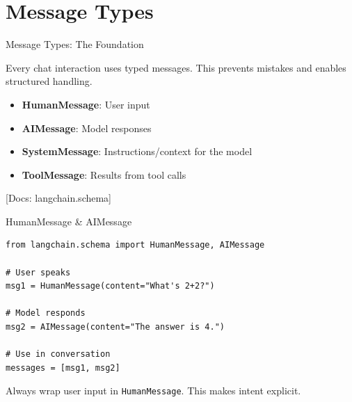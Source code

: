 \documentclass[aspectratio=169,11pt]{beamer}
\newcommand{\docref}[1]{{\scriptsize\color{docgray}[Docs: #1]}}
\begin{document}
\section{Message Types}

\begin{frame}[fragile]{Message Types: The Foundation}
  \begin{conceptbox}
    Every chat interaction uses typed messages. This prevents mistakes and enables structured handling.
  \end{conceptbox}

  \begin{itemize}
    \setlength{\itemsep}{1pt}
    \item \textbf{HumanMessage}: User input
    \item \textbf{AIMessage}: Model responses
    \item \textbf{SystemMessage}: Instructions/context for the model
    \item \textbf{ToolMessage}: Results from tool calls
  \end{itemize}

  \docref{langchain.schema}
\end{frame}

\begin{frame}[fragile]{HumanMessage \& AIMessage}
  \begin{codebox}
    \begin{lstlisting}
from langchain.schema import HumanMessage, AIMessage

# User speaks
msg1 = HumanMessage(content="What's 2+2?")

# Model responds
msg2 = AIMessage(content="The answer is 4.")

# Use in conversation
messages = [msg1, msg2]
    \end{lstlisting}
  \end{codebox}

  \vspace{0.08cm}
  \begin{tipbox}[Convention]
    Always wrap user input in \texttt{HumanMessage}. This makes intent explicit.
  \end{tipbox}
\end{frame}
\end{document}
